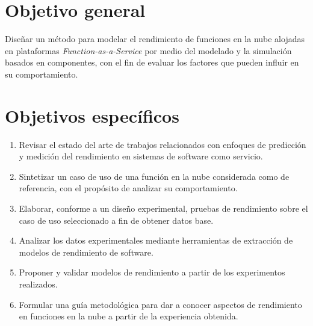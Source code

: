 \section{Objetivo general}
Diseñar un método para modelar el rendimiento de funciones en la nube alojadas en plataformas \emph{Function-as-a-Service} por medio del modelado y la simulación basados en componentes, con el fin de evaluar los factores que pueden influir en su comportamiento. 

\section{Objetivos específicos}
\begin{enumerate}
    \item Revisar el estado del arte de trabajos relacionados con enfoques de predicción y medición del rendimiento en sistemas de software como servicio.
    \item Sintetizar un caso de uso de una función en la nube considerada como de referencia, con el propósito de analizar su comportamiento.
    \item Elaborar, conforme a un diseño experimental, pruebas de rendimiento sobre el caso de uso seleccionado a fin de obtener datos base.
    \item Analizar los datos experimentales mediante herramientas de extracción de modelos de rendimiento de software.
    \item Proponer y validar modelos de rendimiento a partir de los experimentos realizados.        
    \item Formular una guía metodológica para dar a conocer aspectos de rendimiento en funciones en la nube a partir de la experiencia obtenida.
\end{enumerate}